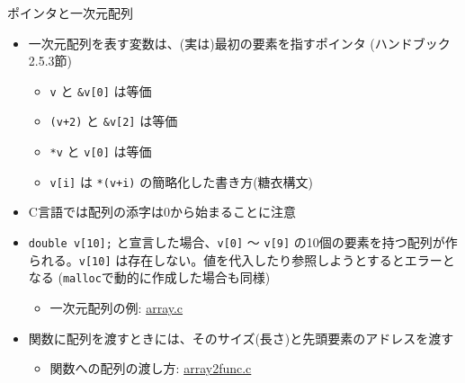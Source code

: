 \begin{frame}[t,fragile]{ポインタと一次元配列}
  \begin{itemize}
  \item 一次元配列を表す変数は、(実は)最初の要素を指すポインタ (ハンドブック2.5.3節)
    \begin{itemize}
    \item \verb+v+ と \verb+&v[0]+ は等価
    \item \verb^(v+2)^ と \verb^&v[2]^ は等価
    \item \verb^*v^ と \verb^v[0]^ は等価
    \item \verb^v[i]^ は \verb^*(v+i)^ の簡略化した書き方(糖衣構文)
    \end{itemize}
  \item C言語では配列の添字は0から始まることに注意
  \item \verb^double v[10];^ と宣言した場合、\verb^v[0]^ 〜 \verb^v[9]^ の10個の要素を持つ配列が作られる。\verb^v[10]^ は存在しない。値を代入したり参照しようとするとエラーとなる (\verb^malloc^で動的に作成した場合も同様)
    \begin{itemize}
    \item 一次元配列の例: \href{https://github.com/todo-group/computer-experiments/blob/master/exercise/basics/array.c}{array.c}
    \end{itemize}
  \item 関数に配列を渡すときには、そのサイズ(長さ)と先頭要素のアドレスを渡す
    \begin{itemize}
    \item 関数への配列の渡し方: \href{https://github.com/todo-group/computer-experiments/blob/master/exercise/basics/array2func.c}{array2func.c}
    \end{itemize}
  \end{itemize}
\end{frame}
